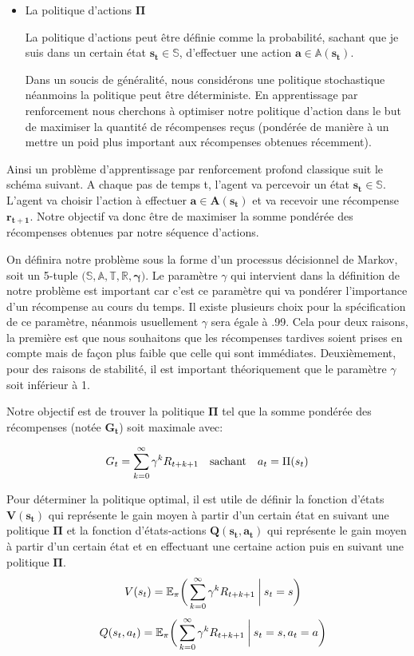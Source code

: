 \begin{itemize}
    \item La politique d'actions $\bm{\Pi}$
    
        La politique d'actions peut être définie  comme la probabilité, sachant que je suis dans un certain état $\bm{s_t \in \mathbb{S}}$, d'effectuer une action $\bm{a \in \mathbb{A}(s_t)}$.

Dans un soucis de généralité, nous considérons une politique stochastique néanmoins la politique peut être déterministe. En apprentissage par renforcement nous cherchons à optimiser notre politique d'action dans le but de maximiser la quantité de récompenses reçus (pondérée de manière à un mettre un poid plus important aux récompenses obtenues récemment).
        

\end{itemize}

Ainsi un problème d'apprentissage par renforcement profond classique suit le schéma suivant. A chaque pas de temps t, l'agent va percevoir un état $\bm{s_t \in \mathbb{S}}$. L'agent va choisir l'action à effectuer $\bm{a \in A(s_t)}$ et va recevoir une récompense $\bm{r_{t+1}}$. Notre objectif va donc être de maximiser la somme pondérée des récompenses obtenues par notre séquence d'actions. 


On définira notre problème sous la forme d'un processus décisionnel de Markov, soit un 5-tuple $\bm{\big(\mathbb{S}, \mathbb{A}, \mathbb{T}, \mathbb{R}, \gamma \big)}$. Le paramètre $\gamma$ qui intervient dans la définition de notre problème est important car c'est ce paramètre qui va pondérer l'importance d'un récompense au cours du temps. Il existe plusieurs choix pour la spécification de ce paramètre, néanmois usuellement $\gamma$ sera égale à .99. Cela pour deux raisons, la première est que nous souhaitons que les récompenses tardives soient prises en compte mais de façon plus faible que celle qui sont immédiates. Deuxièmement, pour des raisons de stabilité, il est important théoriquement que le paramètre $\gamma$ soit inférieur à 1.


Notre objectif est de trouver la politique $\bm{\Pi}$ tel que la somme pondérée des récompenses (notée $\bm{G_t}$) soit maximale avec:

\begin{align}
G_t = \sum_{k=0}^{\infty} \gamma^kR_{t+k+1} \quad \text{sachant} \quad a_t = \Pi(s_t)
\end{align}

Pour déterminer la politique optimal, il est utile de définir la fonction d'états $\bm{V(s_t)}$ qui représente le gain moyen à partir d'un certain état en suivant une  politique $\bm{\Pi}$ et la fonction d'états-actions $\bm{Q(s_t, a_t)}$ qui représente le gain moyen à partir d'un certain état et en effectuant une certaine action puis en suivant une  politique $\bm{\Pi}$.
\begin{gather}
\quad V(s_t) = \mathbb{E_\pi}\bigg(\sum_{k=0}^{\infty} \gamma^kR_{t+k+1} \:\bigg\vert\: s_t=s \bigg) \\[.1cm]
\quad  Q(s_t,a_t) = \mathbb{E_\pi}\bigg(\sum_{k=0}^{\infty} \gamma^kR_{t+k+1} \:\bigg\vert\: s_t=s, a_t=a \bigg)
\end{gather}


